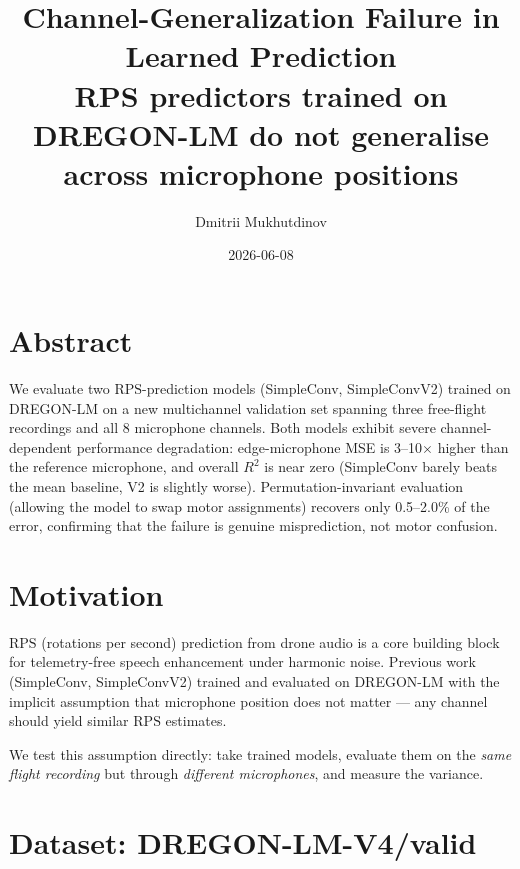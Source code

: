 \documentclass[11pt,a4paper]{article}
\title{\textbf{Channel-Generalization Failure in Learned \rps{} Prediction}\\
  \large RPS predictors trained on DREGON-LM do not generalise across microphone positions}
\author{Dmitrii Mukhutdinov}
\date{2026-06-08}
\newcommand{\rps}{\ensuremath{\mathrm{RPS}}}
\newcommand{\rsq}{\ensuremath{R^{2}}}
\begin{document}
\maketitle

\section*{Abstract}

We evaluate two \rps{}-prediction models (SimpleConv, SimpleConvV2) trained on DREGON-LM
on a new multichannel validation set spanning three free-flight recordings and all
8 microphone channels. Both models exhibit severe channel-dependent performance
degradation: edge-microphone MSE is 3--10$\times$ higher than the reference microphone,
and overall \rsq{} is near zero (SimpleConv barely beats the mean baseline, V2 is
slightly worse). Permutation-invariant evaluation (allowing the model to swap motor
assignments) recovers only 0.5--2.0\% of the error, confirming that the failure is
genuine misprediction, not motor confusion.

\section{Motivation}

\rps{} (rotations per second) prediction from drone audio is a core building block
for telemetry-free speech enhancement under harmonic noise. Previous work
(SimpleConv, SimpleConvV2) trained and evaluated on DREGON-LM with the implicit
assumption that microphone position does not matter --- any channel should yield
similar \rps{} estimates.

We test this assumption directly: take trained models, evaluate them on the
\emph{same flight recording} but through \emph{different microphones}, and measure
the variance.

\section{Dataset: DREGON-LM-V4/valid}
\end{document}
